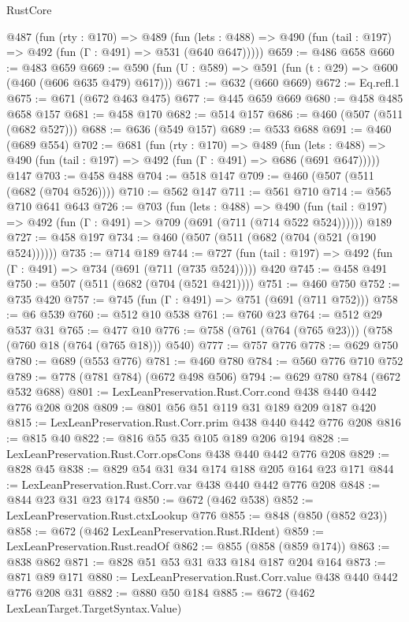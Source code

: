 \begin{lexlean}{RustCore}
\begin{coremodule}
  @487
    (fun (rty : @170) =>
    @489
      (fun (lets : @488) => @490 (fun (tail : @197) => @492 (fun (Γ : @491) => @531 (@640 @647)))))
@659 := @486 @658
@660 := @483 @659
@669 := @590 (fun (U : @589) => @591 (fun (t : @29) => @600 (@460 (@606 @635 @479) @617)))
@671 := @632 (@660 @669)
@672 := Eq.refl.{1}
@675 := @671 (@672 @463 @475)
@677 := @445 @659 @669
@680 := @458 @485 @658 @157
@681 := @458 @170
@682 := @514 @157
@686 := @460 (@507 (@511 (@682 @527)))
@688 := @636 (@549 @157)
@689 := @533 @688
@691 := @460 (@689 @554)
@702 := @681
    (fun (rty : @170) =>
    @489
      (fun (lets : @488) => @490 (fun (tail : @197) => @492 (fun (Γ : @491) => @686 (@691 @647)))))
    @147
@703 := @458 @488
@704 := @518 @147
@709 := @460 (@507 (@511 (@682 (@704 @526))))
@710 := @562 @147
@711 := @561 @710
@714 := @565 @710 @641 @643
@726 := @703
    (fun (lets : @488) =>
    @490 (fun (tail : @197) => @492 (fun (Γ : @491) => @709 (@691 (@711 (@714 @522 @524))))))
    @189
@727 := @458 @197
@734 := @460 (@507 (@511 (@682 (@704 (@521 (@190 @524))))))
@735 := @714 @189
@744 := @727 (fun (tail : @197) => @492 (fun (Γ : @491) => @734 (@691 (@711 (@735 @524))))) @420
@745 := @458 @491
@750 := @507 (@511 (@682 (@704 (@521 @421))))
@751 := @460 @750
@752 := @735 @420
@757 := @745 (fun (Γ : @491) => @751 (@691 (@711 @752)))
@758 := @6 @539
@760 := @512 @10 @538
@761 := @760 @23
@764 := @512 @29 @537 @31
@765 := @477 @10
@776 := @758 (@761 (@764 (@765 @23))) (@758 (@760 @18 (@764 (@765 @18))) @540)
@777 := @757 @776
@778 := @629 @750
@780 := @689 (@553 @776)
@781 := @460 @780
@784 := @560 @776 @710 @752
@789 := @778 (@781 @784) (@672 @498 @506)
@794 := @629 @780 @784 (@672 @532 @688)
@801 := LexLeanPreservation.Rust.Corr.cond @438 @440 @442 @776 @208 @208
@809 := @801 @56 @51 @119 @31 @189 @209 @187 @420
@815 := LexLeanPreservation.Rust.Corr.prim @438 @440 @442 @776 @208
@816 := @815 @40
@822 := @816 @55 @35 @105 @189 @206 @194
@828 := LexLeanPreservation.Rust.Corr.opsCons @438 @440 @442 @776 @208
@829 := @828 @45
@838 := @829 @54 @31 @34 @174 @188 @205 @164 @23 @171
@844 := LexLeanPreservation.Rust.Corr.var @438 @440 @442 @776 @208
@848 := @844 @23 @31 @23 @174
@850 := @672 (@462 @538)
@852 := LexLeanPreservation.Rust.ctxLookup @776
@855 := @848 (@850 (@852 @23))
@858 := @672 (@462 LexLeanPreservation.Rust.RIdent)
@859 := LexLeanPreservation.Rust.readOf
@862 := @855 (@858 (@859 @174))
@863 := @838 @862
@871 := @828 @51 @53 @31 @33 @184 @187 @204 @164
@873 := @871 @89 @171
@880 := LexLeanPreservation.Rust.Corr.value @438 @440 @442 @776 @208 @31
@882 := @880 @50 @184
@885 := @672 (@462 LexLeanTarget.TargetSyntax.Value)

\end{coremodule}
\end{lexlean}

